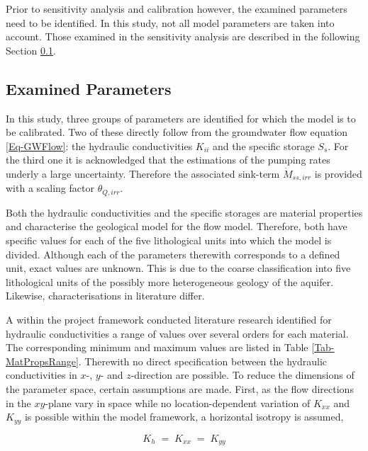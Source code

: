 Prior to sensitivity analysis and calibration however, the examined parameters need to be identified. 
In this study, not all model parameters are taken into account. 
Those examined in the sensitivity analysis are described in the following Section \ref{Sec-SubMethParams}.


\subsection{Examined Parameters}
\label{Sec-SubMethParams}

In this study, three groups of parameters are identified for which the model is to be calibrated. 
Two of these directly follow from the groundwater flow equation \eqref{Eq-GWFlow}: the hydraulic conductivities $K_{ii}$ and the specific storage $S_s$. 
For the third one it is acknowledged that the estimations of the pumping rates underly a large uncertainty. 
Therefore the associated sink-term $\dot{M}_{ss,irr}$ is provided with a scaling factor $\theta_{Q,irr}$.

Both the hydraulic conductivities and the specific storages are material properties and characterise the geological model for the flow model. 
Therefore, both have specific values for each of the five lithological units into which the model is divided. 
Although each of the parameters therewith corresponds to a defined unit, exact values are unknown. 
This is due to the coarse classification into five lithological units of the possibly more heterogeneous geology of the aquifer. 
Likewise, characterisations in literature differ.

A within the project framework conducted literature research identified for hydraulic conductivities a range of values over several orders for each material. 
The corresponding minimum and maximum values are listed in Table \ref{Tab-MatPropsRange}. 
Therewith no direct specification between the hydraulic conductivities in $x$-, $y$- and $z$-direction are possible. 
To reduce the dimensions of the parameter space, certain assumptions are made. 
First, as the flow directions in the $xy$-plane vary in space while no location-dependent variation of $K_{xx}$ and $K_{yy}$ is possible within the model framework, a horizontal isotropy is assumed,

\begin{equation}
    K_h \; = \; K_{xx} \; = \; K_{yy}
\end{equation}


